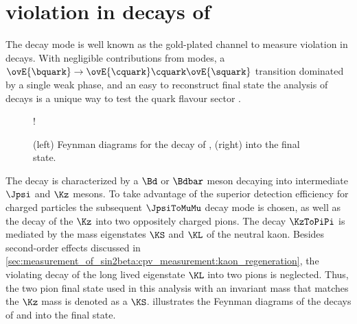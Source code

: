 
\section[
  head={\CP violation in decays of \BdToJpsiKS},
  tocentry={\CPHyperref violation in decays of \BdToJpsiKSHyperref}
]{\CPbfsf violation in decays of \BdToJpsiKSbfsf}
\label{sec:cpv_theory:bd2jpsiks}

The decay mode \BdToJpsiKS is well known as the gold-plated channel to measure
\CP violation in \Bd decays. With negligible contributions from \DCS modes, a
$\ovE{\bquark}\to\ovE{\cquark}\cquark\ovE{\squark}$ transition dominated by a
single weak phase, and an easy to reconstruct final state the analysis of
\BdToJpsiKS decays is a unique way to test the \SM quark flavour sector
\cite{Bevan:2014iga}.

\begin{figure}[ht]
\centering
\resizebox {1\textwidth} {!}{
  
   
}
\caption{(left) Feynman diagrams for the decay of \Bd, (right) \Bdbar into
the \Jpsi\KS final state.}
\label{fig:cpv_theory:bd2jpsiks:feynman_bdtojpsiks}
\end{figure}

The decay is characterized by a $\Bd$ or $\Bdbar$ meson decaying into
intermediate $\Jpsi$ and $\Kz$ mesons. To take advantage of the superior
detection efficiency for charged particles the subsequent $\JpsiToMuMu$ decay
mode is chosen, as well as the decay of the $\Kz$ into two oppositely charged
pions. The decay $\KzToPiPi$ is mediated by the mass eigenstates $\KS$ and $\KL$
of the neutral kaon. Besides second-order effects discussed in
\cref{sec:measurement_of_sin2beta:cpv_measurement:kaon_regeneration}, the \CP
violating decay of the long lived eigenstate $\KL$ into two pions is neglected.
Thus, the two pion final state used in this analysis with an invariant mass that
matches the $\Kz$ mass is denoted as a $\KS$.
 illustrates the Feynman
diagrams of the decays of \Bd and \Bdbar into the \Jpsi\KS final state.

